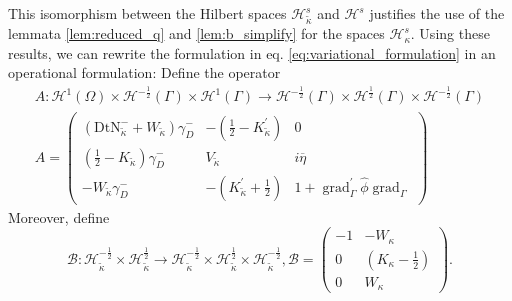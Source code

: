 \documentclass[12pt,journal,compsoc, onecolumn]{IEEEtran}
\begin{document}
This isomorphism between the Hilbert spaces $\mathcal{H}_{\tilde \kappa}^{s}$ and $\mathcal{H}^{s}$ justifies the use of the lemmata \ref{lem:reduced_q} and \ref{lem:b_simplify} for the spaces $\mathcal{H}_\kappa^{s}$.
Using these results, we can rewrite the formulation in eq. \ref{eq:variational_formulation} in an operational formulation:  Define the operator 
\begin{align*}
A: \mathcal{H}^1(\Omega) \times \mathcal{H}^{-\frac{1}{2}}(\Gamma) \times \mathcal{H}^{1}(\Gamma) \rightarrow \mathcal{H}^{-\frac{1}{2}}(\Gamma) \times \mathcal{H}^{\frac{1}{2}}(\Gamma) \times \mathcal{H}^{-\frac{1}{2}}(\Gamma) \\
    A = \begin{pmatrix}
            (\mathrm{DtN}_{\tilde \kappa}^{-} + W_{\tilde \kappa}) \gamma_D^- & - (\frac{1}{2} - K^\prime_{\tilde \kappa}) & 0 \\
            (\frac{1}{2} - K_{\tilde \kappa})\gamma_D^- & V_{\tilde \kappa} & i \overline{\eta} \\
            - W_{\tilde \kappa}\gamma_D^- & - (K^\prime_{\tilde \kappa} + \frac{1}{2}) & 1 + \operatorname{grad}_{\Gamma}^\prime \hat{\phi}\operatorname{grad}_{\Gamma} 
    \end{pmatrix}
\end{align*}
Moreover, define  $$\mathcal{B}:
\mathcal{H}^{-\frac{1}{2}}_{\tilde\kappa} \times \mathcal{H}^{\frac{1}{2}}_{\tilde\kappa} \rightarrow
\mathcal{H}^{-\frac{1}{2}}_{\tilde\kappa} \times \mathcal{H}^{\frac{1}{2}}_{\tilde\kappa} \times \mathcal{H}^{-\frac{1}{2}}_{\tilde\kappa}, \mathcal{B} = 
\begin{pmatrix}
    -1 & -W_{\kappa}  \\
    0 & ( K_{\kappa} - \frac{1}{2}) \\
    0 & W_{\kappa}
\end{pmatrix}.
$$
\end{document}
